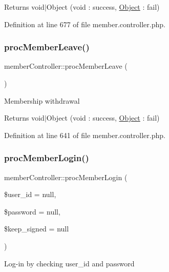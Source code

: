 \begin{DoxyReturn}{Returns}
void$\vert$\+Object (void \+: success, \hyperlink{classObject}{Object} \+: fail) 
\end{DoxyReturn}


Definition at line 677 of file member.\+controller.\+php.

\hypertarget{classmemberController_a4c78a9114c62d27178d70bb4b8d19455}{}\label{classmemberController_a4c78a9114c62d27178d70bb4b8d19455} 
\subsubsection{\texorpdfstring{proc\+Member\+Leave()}{procMemberLeave()}}
{\footnotesize\ttfamily member\+Controller\+::proc\+Member\+Leave (\begin{DoxyParamCaption}{ }\end{DoxyParamCaption})}

Membership withdrawal

\begin{DoxyReturn}{Returns}
void$\vert$\+Object (void \+: success, \hyperlink{classObject}{Object} \+: fail) 
\end{DoxyReturn}


Definition at line 641 of file member.\+controller.\+php.

\hypertarget{classmemberController_a1e37a85198193c84a66b4472a677960d}{}\label{classmemberController_a1e37a85198193c84a66b4472a677960d} 
\subsubsection{\texorpdfstring{proc\+Member\+Login()}{procMemberLogin()}}
{\footnotesize\ttfamily member\+Controller\+::proc\+Member\+Login (\begin{DoxyParamCaption}\item[{}]{\$user\+\_\+id = {\ttfamily null},  }\item[{}]{\$password = {\ttfamily null},  }\item[{}]{\$keep\+\_\+signed = {\ttfamily null} }\end{DoxyParamCaption})}

Log-\/in by checking user\+\_\+id and password


